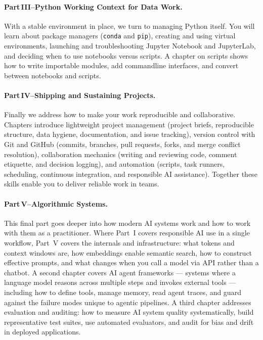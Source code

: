 \paragraph{Part\,III–Python Working Context for Data Work.}  With a stable environment in place, we turn to managing Python itself.  You will learn about package managers (\texttt{conda} and \texttt{pip}), creating and using virtual environments, launching and troubleshooting Jupyter Notebook and JupyterLab, and deciding when to use notebooks versus scripts.  A chapter on scripts shows how to write importable modules, add command\-line interfaces, and convert between notebooks and scripts.

\paragraph{Part\,IV–Shipping and Sustaining Projects.}  Finally we address how to make your work reproducible and collaborative.  Chapters introduce lightweight project management (project briefs, reproducible structure, data hygiene, documentation, and issue tracking), version control with Git and GitHub (commits, branches, pull requests, forks, and merge conflict resolution), collaboration mechanics (writing and reviewing code, comment etiquette, and decision logging), and automation (scripts, task runners, scheduling, continuous integration, and responsible AI assistance).  Together these skills enable you to deliver reliable work in teams.

\paragraph{Part\,V–Algorithmic Systems.}  This final part goes deeper into how modern AI systems work and how to work with them as a practitioner.  Where Part~I covers responsible AI use in a single workflow, Part~V covers the internals and infrastructure: what tokens and context windows are, how embeddings enable semantic search, how to construct effective prompts, and what changes when you call a model via API rather than a chatbot.  A second chapter covers AI agent frameworks --- systems where a language model reasons across multiple steps and invokes external tools --- including how to define tools, manage memory, read agent traces, and guard against the failure modes unique to agentic pipelines.  A third chapter addresses evaluation and auditing: how to measure AI system quality systematically, build representative test suites, use automated evaluators, and audit for bias and drift in deployed applications.

